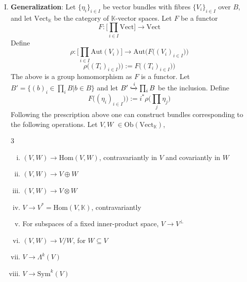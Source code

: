 \documentclass[11pt,a4paper]{article}
\begin{document}
\begin{enumerate}[(I)]
\[\begin{tikzcd}[column sep=small]
	\color{red}{{A\oplus (B\oplus C)}} &&& {A\oplus B\oplus C} \\
	& {GL(V)\times GL(V)} & {GL(V)} \\
	& {GL(V)\times GL(V)\times GL(V)} & {GL(V)\times GL(V)} \\
	{(A, B, C)} &&& \color{blue}{{(A\oplus B)\oplus C}}
	\arrow[from=2-2, to=2-3]
	\arrow[from=3-2, to=2-2]
	\arrow[from=3-3, to=2-3]
	\arrow[from=3-2, to=3-3]
	\arrow[from=4-1, to=1-1]
	\arrow[from=1-1, to=1-4]
	\arrow[from=4-4, to=1-4]
	\arrow[from=4-1, to=4-4]
\end{tikzcd}\]
\item \textbf{Generalization}: Let $\{\eta_i\}_{i\in I}$ be vector bundles with fibres $\{V_i\}_{i\in I}$ over $B$, and let $\text{Vect}_{\mathbb{K}}$ be the category of $\mathbb{K}$-vector spaces. Let $F$ be a functor
$$F: \bigg[\prod\limits_{i\in I}\text{Vect}\bigg]\rightarrow \text{Vect}$$
Define
$$\rho: \bigg[\prod\limits_{i\in I}\text{Aut}(V_i)\bigg]\rightarrow \text{Aut}\bigg(F\big((V_i)_{i\in I}\big)\bigg)$$
$$\rho\big((T_i)_{i\in I})\big):= F\big((T_i)_{i\in I})\big)$$
The above is a group homomorphism as $F$ is a functor. Let $B' = \{(b)_i\in \prod_iB  |  b\in B\}$ and let $B'\xhookrightarrow{i} \prod_iB$ be the inclusion. Define
$$F\big((\eta_i)_{i\in I})\big):= i^*\rho\bigg(\prod_j\eta_j\bigg)$$
Following the prescription above one can construct bundles corresponding to the following operations. Let $V, W$ $\in \text{Ob}(\text{Vect}_{\mathbb{K}})$,
\begin{multicols}{3}
    \begin{enumerate}[(i)]
    \item $(V, W) \rightarrow \text{Hom}(V, W)$, contravariantly in $V$ and covariantly in $W$
    \item $(V, W) \rightarrow V\oplus W$
    \item $(V, W) \rightarrow V\otimes W$
    \item $V \rightarrow V^* = \text{Hom}(V, \mathbb{K})$, contravariantly
    \item For subspaces of a fixed inner-product space, $V \rightarrow V^{\perp}$
    \item $(V,W)\rightarrow V/W$, for $W\subseteq V$
    \item $V \rightarrow \Lambda^k(V)$
    \item $V \rightarrow \text{Sym}^k(V)$
\end{enumerate}
\end{multicols}

\end{enumerate}
\end{document}
